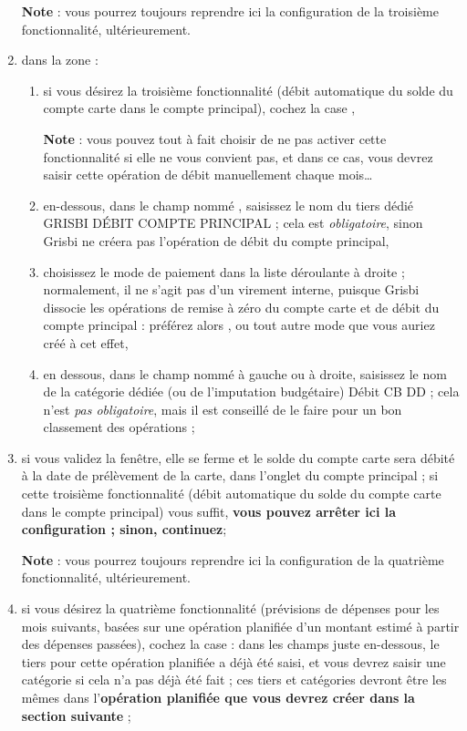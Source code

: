 \begin{enumerate}
	\textbf{Note} : vous pourrez toujours reprendre ici la configuration de la troisième fonctionnalité, ultérieurement.

	\item  dans la zone  :
		\begin{enumerate}
			\item  si vous désirez la troisième fonctionnalité (débit automatique du solde du compte carte dans le compte principal), cochez la case ,

			\textbf{Note} : vous pouvez tout à fait choisir de ne pas activer cette fonctionnalité si elle ne vous convient pas, et dans ce cas, vous devrez saisir cette opération de débit manuellement chaque mois\ldots
			\item  en-dessous, dans le champ nommé , saisissez le nom du tiers dédié \og GRISBI DÉBIT COMPTE PRINCIPAL \fg{} ; cela est \emph{obligatoire}, sinon Grisbi ne créera pas l'opération de débit du compte principal,
			\item choisissez le mode de paiement dans la liste déroulante à droite ; normalement, il ne s'agit pas d'un virement interne, puisque Grisbi dissocie les opérations de remise à zéro du compte carte et de débit du compte principal : préférez alors , ou tout autre mode que vous auriez créé à cet effet,
			\item en dessous, dans le champ nommé  à gauche ou  à droite, saisissez le nom de la catégorie dédiée (ou de l'imputation budgétaire) \og Débit CB DD \fg{} ; cela n'est \emph{pas obligatoire}, mais il est conseillé de le faire pour un bon classement des opérations ;
		\end{enumerate}
	\item  si vous validez la fenêtre, elle se ferme et le solde du compte carte sera débité à la date de prélèvement de la carte, dans l'onglet  du compte principal ; si cette troisième fonctionnalité (débit automatique du solde du compte carte dans le compte principal) vous suffit, \textbf{vous pouvez arrêter ici la configuration ; sinon, continuez};

			\textbf{Note} : vous pourrez toujours reprendre ici la configuration de la quatrième fonctionnalité, ultérieurement.	
	\item  si vous désirez la quatrième fonctionnalité (prévisions de dépenses pour les mois suivants, basées sur une opération planifiée d'un montant estimé à partir des dépenses passées), cochez la case  : dans les champs juste en-dessous, le tiers pour cette opération planifiée a déjà été saisi, et vous devrez saisir une catégorie si cela n'a pas déjà été fait ; ces tiers et catégories devront être les mêmes dans l'\textbf{opération planifiée que vous devrez créer dans la section suivante} ;


\end{enumerate}
